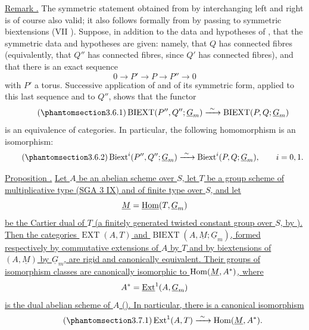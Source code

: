 \medskip
\noindent\underline{Remark .}  The symmetric statement obtained
from  by interchanging left and right is of course also valid; it
also follows formally from  by passing to symmetric biextensions
(VII ).  Suppose, in addition to the data and hypotheses of ,
that the symmetric data and hypotheses are given: namely, that $Q$
has connected fibres (equivalently, that $Q''$ has connected fibres,
since $Q'$ has connected fibres), and that there is an exact sequence
\[
 0\longrightarrow P'\longrightarrow P\longrightarrow P''
 \longrightarrow0
\]
with $P'$ a torus.  Successive application of  and of its
symmetric form, applied to this last sequence and to $Q''$, shows
that the functor
\begin{equation}\tag{\SGARefTarget{sga7.sga7i.eviii.n3-6-1}{3.6.1}}
 \operatorname{BIEXT}(P'',Q'';\underline G_m)
 \xrightarrow{\ \sim\ }
 \operatorname{BIEXT}(P,Q;\underline G_m)
\end{equation}
is an equivalence of categories.  In particular, the following
homomorphism is an isomorphism:
\begin{equation}\tag{\SGARefTarget{sga7.sga7i.eviii.n3-6-2}{3.6.2}}
 \Biext^i(P'',Q'';\underline G_m)
 \xrightarrow{\ \sim\ }
 \Biext^i(P,Q;\underline G_m),
 \qquad i=0,1.
\end{equation}

\medskip
\noindent\underline{Proposition .}  \underline{Let $A$ be an
abelian scheme over $S$, let $T$ be a group scheme of multiplicative
type (SGA 3 IX) and of finite type over $S$, and let}
\[
 \underline M=\uHom(T,\underline G_m)
\]
\underline{be the Cartier dual of $T$ (a finitely generated twisted
constant group over $S$, by ).  Then the categories
$\operatorname{EXT}(A,T)$ and
$\operatorname{BIEXT}(A,\underline M;\underline G_m)$, formed
respectively by commutative extensions of $A$ by $T$ and by
biextensions of $(A,\underline M)$ by $\underline G_m$, are rigid and
canonically equivalent.  Their groups of isomorphism classes are
canonically isomorphic to $\Hom(\underline M,A^*)$, where}
\[
 A^*=\uExt^1(A,\underline G_m)
\]
\underline{is the dual abelian scheme of $A$ ().  In particular,
there is a canonical isomorphism}
\begin{equation}\tag{\SGARefTarget{sga7.sga7i.eviii.n3-7-1}{3.7.1}}
 \Ext^1(A,T)\xrightarrow{\ \sim\ }
 \Hom(\underline M,A^*).
\end{equation}

